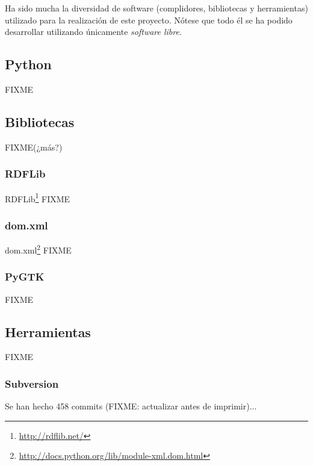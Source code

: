 Ha sido mucha la diversidad de software (complidores, bibliotecas y herramientas)
utilizado para la realización de este proyecto. Nótese que todo él se ha podido
desarrollar utilizando únicamente \emph{software libre}.

\subsection*{Python}

FIXME

\subsection*{Bibliotecas\label{sec:conclu:bib}}

FIXME(¿más?)

\subsubsection{RDFLib}

RDFLib\footnote{\url{http://rdflib.net/}} FIXME

\subsubsection{dom.xml}

dom.xml\footnote{\url{http://docs.python.org/lib/module-xml.dom.html}} FIXME

\subsubsection{PyGTK}

FIXME

\subsection*{Herramientas}

FIXME

\subsubsection{Subversion}

Se han hecho 458 commits (FIXME: actualizar antes de imprimir)...

